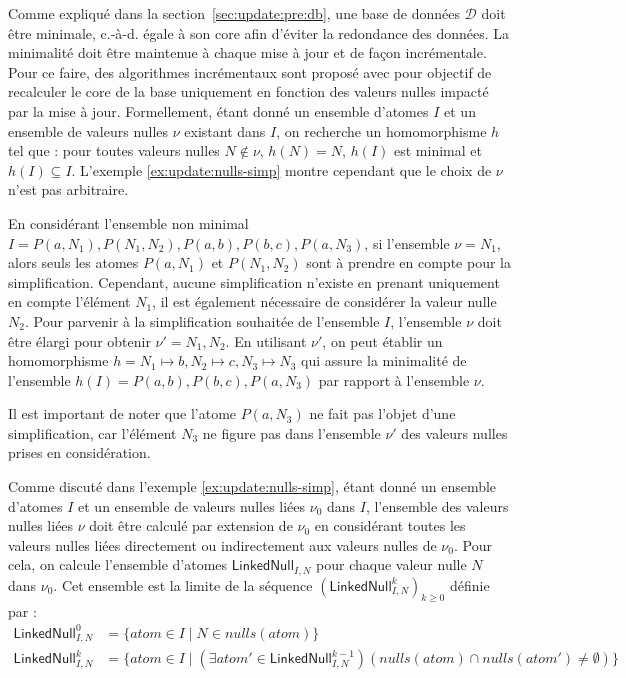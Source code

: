 Comme expliqué dans la section~\ref{sec:update:pre:db}, une base de données $\mathcal{D}$ doit être minimale, c.-à-d. égale à son \gls{core} afin d'éviter la redondance des données.
La minimalité doit être maintenue à chaque mise à jour et de façon incrémentale.
Pour ce faire, des algorithmes incrémentaux sont proposé avec pour objectif de recalculer le \gls{core}  de la base uniquement en fonction des valeurs nulles impacté par la mise à jour.
Formellement, étant donné un ensemble d'atomes $I$ et un ensemble de valeurs nulles $\nu$ existant dans $I$, on recherche un homomorphisme $h$ tel que : pour toutes valeurs nulles $N \notin \nu$, $h(N) = N$, $h(I)$ est minimal et $h(I) \subseteq I$.
L'exemple \ref{ex:update:nulls-simp} montre cependant que le choix de $\nu$ n'est pas arbitraire.

\begin{example}
    \label{ex:update:nulls-simp}
	En considérant l'ensemble non minimal $I = {P(a, N_1), P(N_1, N_2), P(a, b), P(b, c), P(a, N_3)}$, si l'ensemble $\nu = {N_1}$, alors seuls les atomes $P(a, N_1)$ et $P(N_1, N_2)$ sont à prendre en compte pour la simplification.
	Cependant, aucune simplification n'existe en prenant uniquement en compte l'élément $N_1$, il est également nécessaire de considérer la valeur nulle $N_2$.
	Pour parvenir à la simplification souhaitée de l'ensemble $I$, l'ensemble $\nu$ doit être élargi pour obtenir $\nu' = {N_1, N_2}$.
	En utilisant $\nu'$, on peut établir un homomorphisme $h = {N_1 \mapsto b, N_2 \mapsto c, N_3 \mapsto N_3}$ qui assure la minimalité de l'ensemble $h(I) = {P(a, b), P(b, c), P(a, N_3)}$ par rapport à l'ensemble $\nu$.

	Il est important de noter que l'atome $P(a, N_3)$ ne fait pas l'objet d'une simplification, car l'élément $N_3$ ne figure pas dans l'ensemble $\nu'$ des valeurs nulles prises en considération.
\end{example}

Comme discuté dans l'exemple \ref{ex:update:nulls-simp}, étant donné un ensemble d'atomes $I$ et un ensemble de valeurs nulles liées $\nu_0$ dans $I$, l'ensemble des valeurs nulles liées $\nu$ doit être calculé par extension de $\nu_0$ en considérant toutes les valeurs nulles liées directement ou indirectement aux valeurs nulles de $\nu_0$.
Pour cela, on calcule l'ensemble d'atomes $\textsf{LinkedNull}_{I,N}$ pour chaque valeur nulle $N$ dans $\nu_0$.
Cet ensemble est la limite de la séquence $(\textsf{LinkedNull}^k_{I,N})_{k \ge 0}$ définie par :
\begin{align}
    \textsf{LinkedNull}^0_{I,N} &= \{atom \in I \mid N \in nulls(atom)\} \\
    \textsf{LinkedNull}^k_{I,N} &= \{atom \in I \mid (\exists atom' \in \textsf{LinkedNull}^{k-1}_{I,N})(nulls(atom) \cap nulls(atom') \neq \emptyset)\}
\end{align} 

